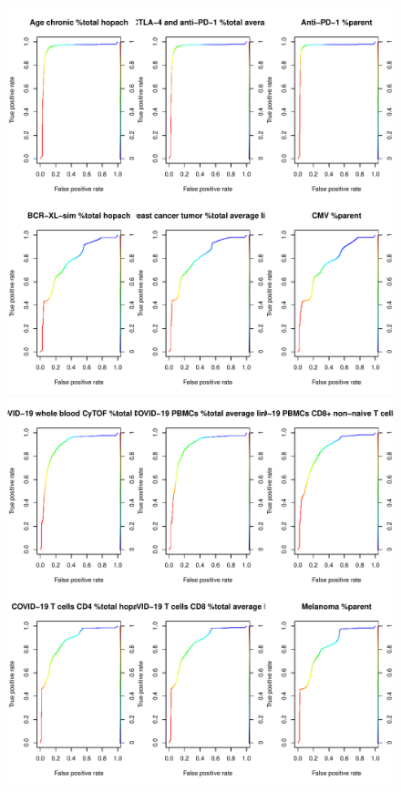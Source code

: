 \begin{figure}[H]
\begin{knitrout}
\color{fgcolor}\begin{kframe}


{\ttfamily\noindent\color{warningcolor}{\#\# Warning in ncases * ncontrols: NAs produced by integer overflow}}\end{kframe}
\includegraphics[width=\maxwidth]{figure/ch04_figunnamed-chunk-1-1} 

\includegraphics[width=\maxwidth]{figure/ch04_figunnamed-chunk-1-2} 


\end{knitrout}
\end{figure}
